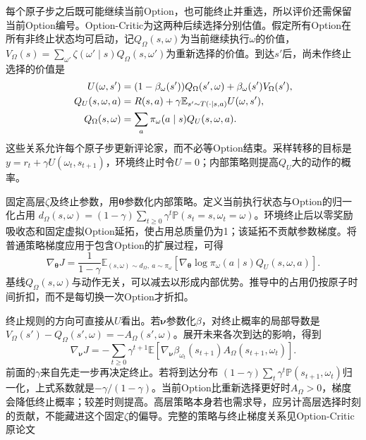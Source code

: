 每个原子步之后既可能继续当前Option，也可能终止并重选，所以评价还需保留当前Option编号。Option-Critic为这两种后续选择分别估值。假定所有Option在所有非终止状态均可启动，记$Q_\Omega(s,\omega)$为当前继续执行$\omega$的价值，
$V_\Omega(s)=\sum_{\omega'}\zeta(\omega'\mid s)Q_\Omega(s,\omega')$为重新选择的价值。到达$s'$后，尚未作终止选择的价值是
\begin{align}
 U(\omega,s')
   &=(1-\beta_\omega(s'))Q_\Omega(s',\omega)
                               +\beta_\omega(s')V_\Omega(s'),\notag\\
 Q_U(s,\omega,a)
   &=R(s,a)+\gamma\mathbb E_{s'\sim T(\cdot\mid s,a)}U(\omega,s'),\notag\\
 Q_\Omega(s,\omega)&=\sum_a\pi_\omega(a\mid s)Q_U(s,\omega,a).
 \label{eq:rl-learning-option-critic}
\end{align}
这些关系允许每个原子步更新评论家，而不必等Option结束。采样转移的目标是
$y=r_t+\gamma U(\omega_t,s_{t+1})$，环境终止时令$U=0$；内部策略则提高$Q_U$大的动作的概率。

固定高层$\zeta$及终止参数，用$\bm\theta$参数化内部策略。定义当前执行状态与Option的归一化占用
$d_\Omega(s,\omega)=(1-\gamma)\sum_{t\geq0}\gamma^t
\mathbb P(s_t=s,\omega_t=\omega)$。环境终止后以零奖励吸收态和固定虚拟Option延拓，使占用总质量仍为1；该延拓不贡献参数梯度。将普通策略梯度应用于包含Option的扩展过程，可得
\begin{equation}
 \nabla_{\bm\theta}J
   =\frac{1}{1-\gamma}
     \mathbb E_{(s,\omega)\sim d_\Omega,\ a\sim\pi_\omega}
       [\nabla_{\bm\theta}\log\pi_\omega(a\mid s)
                                    Q_U(s,\omega,a)].
 \label{eq:rl-learning-intra-option-gradient}
\end{equation}
基线$Q_\Omega(s,\omega)$与动作无关，可以减去以形成内部优势。推导中的占用仍按原子时间折扣，而不是每切换一次Option才折扣。

终止规则的方向可直接从$U$看出。若$\bm\nu$参数化$\beta$，对终止概率的局部导数是
$V_\Omega(s')-Q_\Omega(s',\omega)=-A_\Omega(s',\omega)$。展开未来各次到达的影响，得到
\begin{equation}
 \nabla_{\bm\nu}J
   =-\sum_{t\geq0}\gamma^{t+1}
       \mathbb E[
          \nabla_{\bm\nu}\beta_{\omega_t}(s_{t+1})
                          A_\Omega(s_{t+1},\omega_t)].
 \label{eq:rl-learning-termination-gradient}
\end{equation}
前面的$\gamma$来自先走一步再决定终止。若将到达分布
$(1-\gamma)\sum_t\gamma^t\mathbb P(s_{t+1},\omega_t)$归一化，上式系数就是$-\gamma/(1-\gamma)$。当前Option比重新选择更好时$A_\Omega>0$，梯度会降低终止概率；较差时则提高。高层策略本身若也需求导，应另计高层选择时刻的贡献，不能藏进这个固定$\zeta$的偏导。完整的策略与终止梯度关系见Option-Critic原论文

